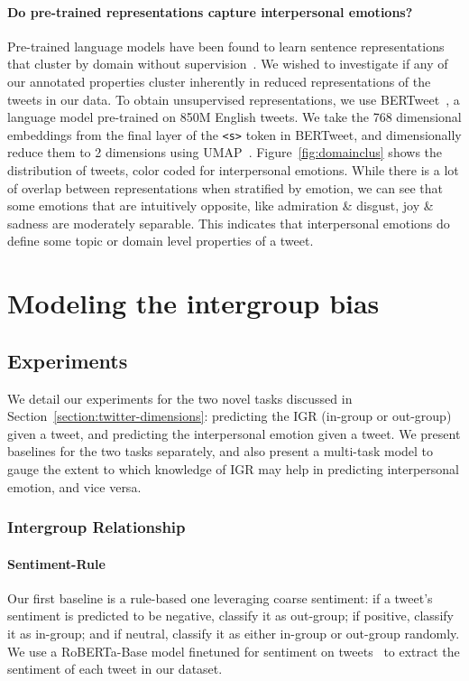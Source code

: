 \paragraph{Do pre-trained representations capture interpersonal emotions?}

Pre-trained language models have been found to learn sentence representations that cluster by domain without supervision~\citep{aharoni-goldberg-2020-unsupervised}. We wished to investigate if any of our annotated properties cluster inherently in reduced representations of the tweets in our data. To obtain unsupervised representations, we use BERTweet~\citep{nguyen_bertweet_2020}, a language model pre-trained on 850M English tweets. We take the 768 dimensional embeddings from the final layer of the \texttt{<s>} token in BERTweet, and dimensionally reduce them to 2 dimensions using UMAP~\citep{sainburg2021parametric}. Figure~\ref{fig:domainclus} shows the distribution of tweets, color coded for interpersonal emotions. While there is a lot of overlap between representations when stratified by emotion, we can see that some emotions that are intuitively opposite, like admiration \& disgust, joy \& sadness are moderately separable. This indicates that interpersonal emotions do define some topic or domain level properties of a tweet.

\section{Modeling the intergroup bias}
\label{twitter:model}

\subsection{Experiments}

We detail our experiments for the two novel tasks discussed in Section~\ref{section:twitter-dimensions}: predicting the IGR (in-group or out-group) given a tweet, and predicting the interpersonal emotion given a tweet. We present baselines for the two tasks separately, and also present a multi-task model to gauge the extent to which knowledge of IGR may help in predicting interpersonal emotion, and vice versa.

\subsubsection{Intergroup Relationship}

\paragraph{Sentiment-Rule} Our first baseline is a rule-based one leveraging coarse sentiment: if a tweet's sentiment is predicted to be negative, classify it as out-group; if positive, classify it as in-group; and if neutral, classify it as either in-group or out-group randomly. We use a RoBERTa-Base model finetuned for sentiment on tweets~\citep{barbieri-etal-2020-tweeteval} to extract the sentiment of each tweet in our dataset.
    

